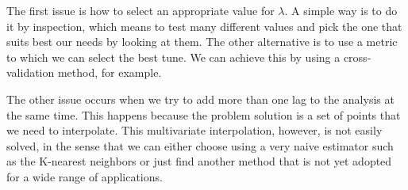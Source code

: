 The first issue is how to select an appropriate value for $\lambda$. A simple way is to do it by inspection, which means to test many different values and pick the one that suits best our needs by looking at them. The other alternative is to use a metric to which we can select the best tune. We can achieve this by using a cross-validation method, for example.

The other issue occurs when we try to add more than one lag to the analysis at the same time. This happens because the problem solution is a set of points that we need to interpolate. This multivariate interpolation, however, is not easily solved, in the sense that we can either choose using a very naive estimator such as the K-nearest neighbors or just find another method that is not yet adopted for a wide range of applications.

%
%
%
%
%
%
%
%
%
%
%
%
%
